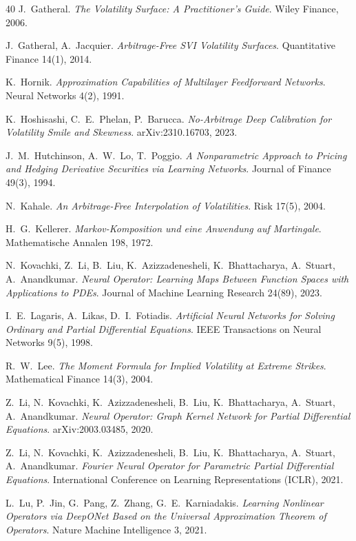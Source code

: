 \begin{thebibliography}{40}
 J.~Gatheral.
\emph{The Volatility Surface: A Practitioner's Guide}. Wiley Finance, 2006.

 J.~Gatheral, A.~Jacquier.
\emph{Arbitrage-Free SVI Volatility Surfaces}. Quantitative Finance 14(1), 2014.

 K.~Hornik.
\emph{Approximation Capabilities of Multilayer Feedforward Networks}. Neural Networks 4(2),
1991.

 K.~Hoshisashi, C.~E.~Phelan, P.~Barucca.
\emph{No-Arbitrage Deep Calibration for Volatility Smile and Skewness}. arXiv:2310.16703, 2023.

 J.~M.~Hutchinson, A.~W.~Lo, T.~Poggio.
\emph{A Nonparametric Approach to Pricing and Hedging Derivative Securities via Learning
Networks}. Journal of Finance 49(3), 1994.

 N.~Kahale.
\emph{An Arbitrage-Free Interpolation of Volatilities}. Risk 17(5), 2004.

 H.~G.~Kellerer.
\emph{Markov-Komposition und eine Anwendung auf Martingale}. Mathematische Annalen 198, 1972.

 N.~Kovachki, Z.~Li, B.~Liu, K.~Azizzadenesheli, K.~Bhattacharya,
A.~Stuart, A.~Anandkumar. \emph{Neural Operator: Learning Maps Between Function Spaces with
Applications to PDEs}. Journal of Machine Learning Research 24(89), 2023.

 I.~E.~Lagaris, A.~Likas, D.~I.~Fotiadis.
\emph{Artificial Neural Networks for Solving Ordinary and Partial Differential Equations}.
IEEE Transactions on Neural Networks 9(5), 1998.

 R.~W.~Lee.
\emph{The Moment Formula for Implied Volatility at Extreme Strikes}. Mathematical Finance 14(3),
2004.

 Z.~Li, N.~Kovachki, K.~Azizzadenesheli, B.~Liu, K.~Bhattacharya, A.~Stuart,
A.~Anandkumar. \emph{Neural Operator: Graph Kernel Network for Partial Differential Equations}.
arXiv:2003.03485, 2020.

 Z.~Li, N.~Kovachki, K.~Azizzadenesheli, B.~Liu, K.~Bhattacharya, A.~Stuart,
A.~Anandkumar. \emph{Fourier Neural Operator for Parametric Partial Differential Equations}.
International Conference on Learning Representations (ICLR), 2021.

 L.~Lu, P.~Jin, G.~Pang, Z.~Zhang, G.~E.~Karniadakis.
\emph{Learning Nonlinear Operators via DeepONet Based on the Universal Approximation Theorem of
Operators}. Nature Machine Intelligence 3, 2021.


\end{thebibliography}
